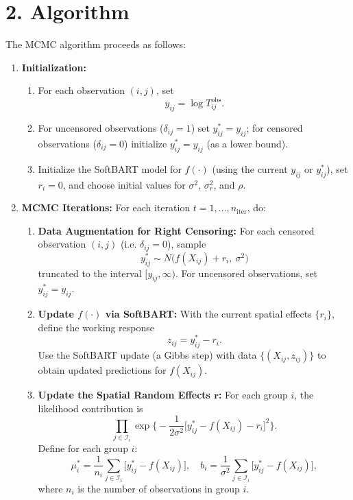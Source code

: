 \documentclass[useAMS,referee]{biom}
\begin{document}
\section*{2. Algorithm}

The MCMC algorithm proceeds as follows:

\begin{enumerate}
  \item \textbf{Initialization:}
    \begin{enumerate}
      \item For each observation $(i,j)$, set 
        \[
        y_{ij} = \log T_{ij}^{\text{obs}}.
        \]
      \item For uncensored observations ($\delta_{ij}=1$) set $y_{ij}^\ast=y_{ij}$; for censored observations ($\delta_{ij}=0$) initialize $y_{ij}^\ast=y_{ij}$ (as a lower bound).
      \item Initialize the SoftBART model for $f(\cdot)$ (using the current $y_{ij}$ or $y_{ij}^\ast$), set $r_i=0$, and choose initial values for $\sigma^2$, $\sigma_r^2$, and $\rho$.
    \end{enumerate}
  
  \item \textbf{MCMC Iterations:} For each iteration $t=1,\ldots,n_{\text{iter}}$, do:
    \begin{enumerate}
      \item \textbf{Data Augmentation for Right Censoring:} For each censored observation $(i,j)$ (i.e. $\delta_{ij}=0$), sample
        \[
        y_{ij}^\ast \sim N\Big(f(X_{ij})+r_i,\ \sigma^2\Big)
        \]
        truncated to the interval $[y_{ij}, \infty)$. For uncensored observations, set $y_{ij}^\ast=y_{ij}$.
      
      \item \textbf{Update $f(\cdot)$ via SoftBART:}  
        With the current spatial effects $\{r_i\}$, define the working response
        \[
        z_{ij} = y_{ij}^\ast - r_i.
        \]
        Use the SoftBART update (a Gibbs step) with data $\{(X_{ij},z_{ij})\}$ to obtain updated predictions for $f(X_{ij})$.
      
      \item \textbf{Update the Spatial Random Effects $\bm{r}$:}  
        For each group $i$, the likelihood contribution is
        \[
        \prod_{j\in \mathcal{I}_i} \exp\Big\{-\frac{1}{2\sigma^2}\big[y_{ij}^\ast-f(X_{ij})-r_i\big]^2\Big\}.
        \]
        Define for each group $i$:
        \[
        \mu_i^\ast = \frac{1}{n_i}\sum_{j\in \mathcal{I}_i}\Big[y_{ij}^\ast-f(X_{ij})\Big],\quad b_i = \frac{1}{\sigma^2}\sum_{j\in \mathcal{I}_i}\Big[y_{ij}^\ast-f(X_{ij})\Big],
        \]
        where $n_i$ is the number of observations in group $i$.  
        

\end{enumerate}
\end{enumerate}
\end{document}
